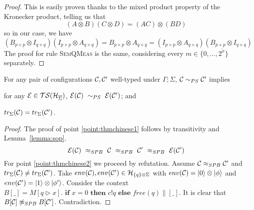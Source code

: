 \begin{proof}
	This is easily proven thanks to the mixed product property of the Kronecker product, telling us that 
	\[ (A \otimes B)(C \otimes D) = (AC)\otimes(BD)
	\]
	so in our case, we have 
	\[
	(B_{p\times p} \otimes I_{q\times q}) (I_{p\times p} \otimes A_{q\times q}) = B_{p\times p} \otimes A_{q \times q} = (I_{p\times p} \otimes A_{q\times q}) (B_{p\times p} \otimes I_{q\times q})
	\]	
The proof for rule {\scshape SemQMeas} is the same, considering every $m \in \{0, \dots, 2^{\widetilde{x}}\}$ separately.
\end{proof}


\begin{theorem}
	For any pair of configurations $\mathcal{C}, \mathcal{C}'$ well-typed under $\Gamma; \Sigma$, 
	$\mathcal{C} \sim_{PS} \mathcal{C}'$ implies
	\begin{enumerate}
		{\item for any $\mathcal{E} \in \mathcal{TS}(\mathcal{H}_{\overline{\Sigma}})$, $\mathcal{E} (\mathcal{C})\ \sim_{PS} \ \mathcal{E} (\mathcal{C}')$; and \label{point:thmchinese1}}
		{\item $tr_{\Sigma}(\mathcal{C}) = tr_{\Sigma}(\mathcal{C}')$. \label{point:thmchinese2}}
	\end{enumerate}
\end{theorem}
\begin{proof}
	The proof of point \ref{point:thmchinese1} follows by transitivity and Lemma~\ref{lemma:sop}. 
	\[
	 \sop (\conf)\ \approx_{SPB}\ \conf\ \approx_{SPB}\ \conf'\ \approx_{SPB}\ \sop (\conf') 
	\]
	For point \ref{point:thmchinese2} we proceed by refutation.
	Assume $\mathcal{C} \approx_{SPB} \mathcal{C}'$ and $tr_{\Sigma}(\mathcal{C}) \neq tr_{\Sigma}(\mathcal{C}')$.
	Take $env(\mathcal{C}), env(\mathcal{C}') \in \mathcal{H}_{\{ q \} \otimes \Sigma}$ with $env(\mathcal{C}) = \ket{0} \otimes \ket{\phi}$ and $env(\mathcal{C}') = \ket{1} \otimes \ket{\phi'}$.
	Consider the context $B[\_] = M[q \triangleright x] . \textbf{ if } x = 0 \textbf{ then } c!q \textbf{ else } free(q) \parallel [\_]$.
	It is clear that $B[\mathcal{C}] \not\approx_{SPB} B[\mathcal{C}']$. Contradiction.
\end{proof}


